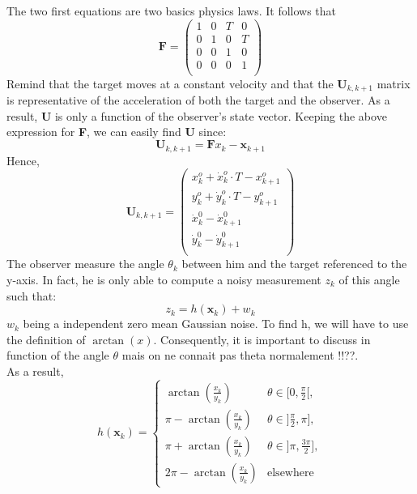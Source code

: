 \documentclass[a4paper,12pt]{report}
\begin{document}
The two first equations are two basics physics laws.  
It follows that \[\textbf{F} = 
   \left (
   \begin{array}{cccc}
      1 & 0 & T & 0 \\
      0 & 1 & 0 & T \\
      0 & 0 & 1 & 0 \\
      0 & 0 & 0 & 1 \\
   \end{array}
   \right )
\]
Remind that the target moves at a constant velocity and that the $\textbf{U}_{k,k+1}$ matrix is representative of the acceleration of both the target and the observer. As a result, \textbf{U} is only a function of the observer's state vector. Keeping the above expression for \textbf{F}, we can easily find \textbf{U} since:
\begin{equation*}
\textbf{U}_{k,k+1} = \textbf{F} x_{k} - \textbf{x}_{k+1}
\end{equation*}
Hence, \[\textbf{U}_{k,k+1} = 
   \left (
   \begin{array}{c}
   	  x^{o}_{k} + \dot{x}^{o}_{k} \cdot T - x^{o}_{k+1} \\
      y^{o}_{k} + \dot{y}^{o}_{k} \cdot T -  y^{o}_{k+1} \\
      \dot{x}^{0}_{k} - \dot{x}^{0}_{k+1} \\
      \dot{y}^{0}_{k} - \dot{y}^{0}_{k+1}\\
   \end{array}
   \right )
\]
The observer measure the angle $\theta_{k}$ between him and the target referenced to the y-axis. In fact, he is only able to compute a noisy measurement $z_{k}$ of this angle such that:
\begin{equation*}
z_{k} = h(\textbf{x}_{k}) + w_{k}
\end{equation*}
$w_{k}$ being a independent zero mean Gaussian noise.
To find h, we will have to use the definition of $\arctan(x)$. Consequently, it is important to discuss in function of the angle $\theta$ {\color{red} mais on ne connait pas theta normalement !!??}.\\ As a result,
\begin{equation*}
      h(\textbf{x}_{k}) =
     \begin{cases}
      \arctan(\frac{x_{k}}{y_{k}}) &  \theta \in [0,\frac{\pi}{2}[,\\
      \pi - \arctan(\frac{x_{k}}{y_{k}}) &   \theta \in ]\frac{\pi}{2},\pi] ,\\
      \pi + \arctan(\frac{x_{k}}{y_{k}}) &   \theta \in ]\pi,\frac{3 \pi}{2}], \\
      2\pi - \arctan(\frac{x_{k}}{y_{k}}) & \text{elsewhere}
     \end{cases}
\end{equation*}
\end{document}
